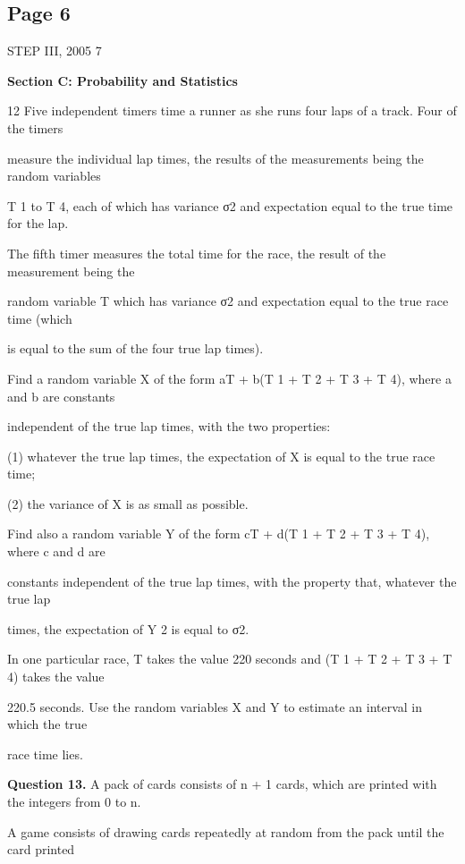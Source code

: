 \documentclass[12pt]{article}
\begin{document}
\subsection*{Page 6}
\begin{flushleft}
STEP III, 2005 7\par
\bigskip\textbf{Section C: Probability and Statistics}\par
12 Five independent timers time a runner as she runs four laps of a track. Four of the timers\par
measure the individual lap times, the results of the measurements being the random variables\par
T 1 to T 4, each of which has variance σ2 and expectation equal to the true time for the lap.\par
The fifth timer measures the total time for the race, the result of the measurement being the\par
random variable T which has variance σ2 and expectation equal to the true race time (which\par
is equal to the sum of the four true lap times).\par
Find a random variable X of the form aT + b(T 1 + T 2 + T 3 + T 4), where a and b are constants\par
independent of the true lap times, with the two properties:\par
(1) whatever the true lap times, the expectation of X is equal to the true race time;\par
(2) the variance of X is as small as possible.\par
Find also a random variable Y of the form cT + d(T 1 + T 2 + T 3 + T 4), where c and d are\par
constants independent of the true lap times, with the property that, whatever the true lap\par
times, the expectation of Y 2 is equal to σ2.\par
In one particular race, T takes the value 220 seconds and (T 1 + T 2 + T 3 + T 4) takes the value\par
220.5 seconds. Use the random variables X and Y to estimate an interval in which the true\par
race time lies.\par
\bigskip\textbf{Question 13.} A pack of cards consists of n + 1 cards, which are printed with the integers from 0 to n.\par
A game consists of drawing cards repeatedly at random from the pack until the card printed\par

\end{flushleft}
\end{document}
